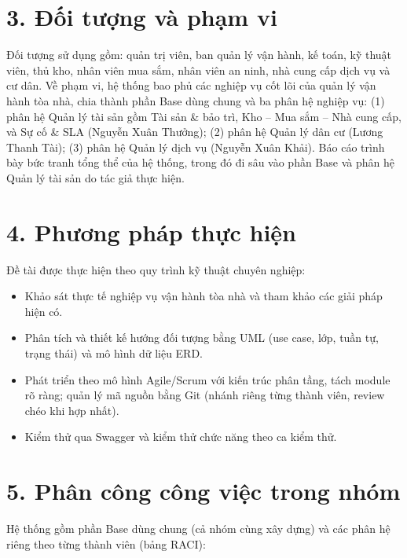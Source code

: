 \section*{3. Đối tượng và phạm vi}
Đối tượng sử dụng gồm: quản trị viên, ban quản lý vận hành, kế toán, kỹ thuật viên, thủ kho, nhân viên mua sắm, nhân viên an ninh, nhà cung cấp dịch vụ và cư dân. Về phạm vi, hệ thống bao phủ các nghiệp vụ cốt lõi của quản lý vận hành tòa nhà, chia thành phần Base dùng chung và ba phân hệ nghiệp vụ: (1) phân hệ Quản lý tài sản gồm Tài sản \& bảo trì, Kho – Mua sắm – Nhà cung cấp, và Sự cố \& SLA (Nguyễn Xuân Thưởng); (2) phân hệ Quản lý dân cư (Lương Thanh Tài); (3) phân hệ Quản lý dịch vụ (Nguyễn Xuân Khải). Báo cáo trình bày bức tranh tổng thể của hệ thống, trong đó đi sâu vào phần Base và phân hệ Quản lý tài sản do tác giả thực hiện.

\section*{4. Phương pháp thực hiện}
Đề tài được thực hiện theo quy trình kỹ thuật chuyên nghiệp:

\begin{itemize}[leftmargin=1.4em,itemsep=1pt,topsep=2pt]
  \item Khảo sát thực tế nghiệp vụ vận hành tòa nhà và tham khảo các giải pháp hiện có.
  \item Phân tích và thiết kế hướng đối tượng bằng UML (use case, lớp, tuần tự, trạng thái) và mô hình dữ liệu ERD.
  \item Phát triển theo mô hình Agile/Scrum với kiến trúc phân tầng, tách module rõ ràng; quản lý mã nguồn bằng Git (nhánh riêng từng thành viên, review chéo khi hợp nhất).
  \item Kiểm thử qua Swagger và kiểm thử chức năng theo ca kiểm thử.
\end{itemize}
\section*{5. Phân công công việc trong nhóm}
Hệ thống gồm phần Base dùng chung (cả nhóm cùng xây dựng) và các phân hệ riêng theo từng thành viên (bảng RACI):

